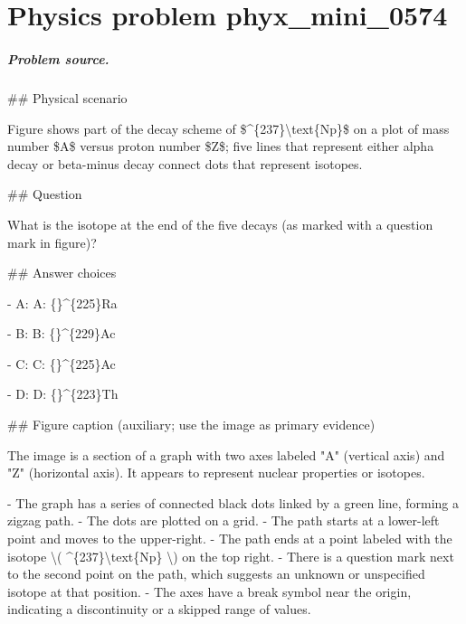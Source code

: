 
\chapter{Physics problem phyx\_mini\_0574}
\label{ch:PhyXMiniProblems_problem_phyx_mini_0574}

\paragraph{Problem source.}
\#\# Physical scenario

Figure shows part of the decay scheme of \$\textasciicircum{}\{237\}\textbackslash{}text\{Np\}\$ on a plot of mass number \$A\$ versus proton number \$Z\$; five lines that represent either alpha decay or beta-minus decay connect dots that represent isotopes.

\#\# Question

What is the isotope at the end of the five decays (as marked with a question mark in figure)?

\#\# Answer choices

- A: A: \{\}\textasciicircum{}\{225\}Ra

- B: B: \{\}\textasciicircum{}\{229\}Ac

- C: C: \{\}\textasciicircum{}\{225\}Ac

- D: D: \{\}\textasciicircum{}\{223\}Th

\#\# Figure caption (auxiliary; use the image as primary evidence)

The image is a section of a graph with two axes labeled "A" (vertical axis) and "Z" (horizontal axis). It appears to represent nuclear properties or isotopes.

- The graph has a series of connected black dots linked by a green line, forming a zigzag path.
- The dots are plotted on a grid. 
- The path starts at a lower-left point and moves to the upper-right.
- The path ends at a point labeled with the isotope \textbackslash{}( \textasciicircum{}\{237\}\textbackslash{}text\{Np\} \textbackslash{}) on the top right.
- There is a question mark next to the second point on the path, which suggests an unknown or unspecified isotope at that position.
- The axes have a break symbol near the origin, indicating a discontinuity or a skipped range of values.

